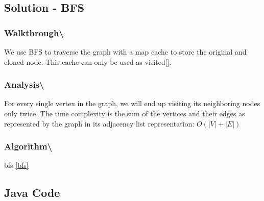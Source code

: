 \documentclass[]{book}
\begin{document}
\hypertarget{solution---bfs-1}{%
\subsection{Solution - BFS}\label{solution---bfs-1}}

\hypertarget{walkthrough-94}{%
\subsubsection{Walkthrough\textbackslash{}}\label{walkthrough-94}}

We use BFS to traverse the graph with a map cache to store the original and cloned node. This cache can only be used
as visited{[}{]}.

\hypertarget{analysis-101}{%
\subsubsection{Analysis\textbackslash{}}\label{analysis-101}}

For every single vertex in the graph, we will end up visiting its neighboring nodes only twice. The time complexity is
the sum of the vertices and their edges as represented by the graph in its adjacency list representation: \(O(|V| + |E|)\)

\hypertarget{algorithm-107}{%
\subsubsection{Algorithm\textbackslash{}}\label{algorithm-107}}

bfs \ref{bfs}

\hypertarget{java-code-62}{%
\subsection{Java Code}\label{java-code-62}}
\end{document}
